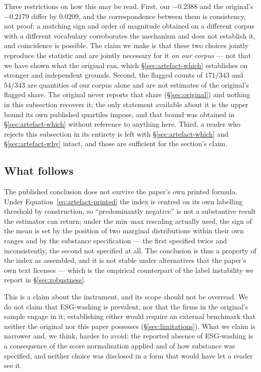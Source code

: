 Three restrictions on how this may be read. First, our $-0.2388$ and the
original's $-0.2179$ differ by $0.0209$, and the correspondence between them is
consistency, not proof: a matching sign and order of magnitude obtained on a
different corpus with a different vocabulary corroborates
the mechanism and does not establish it, and coincidence is possible. The claim
we make is that these two choices jointly reproduce the statistic and are
jointly necessary for it \emph{on our corpus} --- not that we have shown what
the original ran, which \S\ref{sec:artefact-which} establishes on stronger and
independent grounds. Second, the flagged counts of $171/343$ and $54/343$
are quantities of our corpus alone and are not estimates of the original's
flagged share. The original never reports that share (\S\ref{sec:original}) and
nothing in this subsection recovers it; the only statement available about it is
the upper bound its own published quartiles impose, and that bound was obtained
in \S\ref{sec:artefact-which} without reference to anything here. Third, a
reader who rejects this subsection in its entirety is left with
\S\ref{sec:artefact-which} and \S\ref{sec:artefact-why} intact, and those are
sufficient for the section's claim.

\subsection{What follows}
\label{sec:artefact-scope}

The published conclusion does not survive the paper's own printed formula.
Under Equation~\eqref{eq:artefact-printed} the index is centred on its own
labelling threshold by construction, so ``predominantly negative'' is not a
substantive result the estimator can return; under the min--max rescaling
actually used, the sign of the mean is set by the position of two marginal
distributions within their own ranges and by the substance specification --- the
first specified twice and inconsistently, the second not specified at all. The
conclusion is thus a property of the index as assembled, and it is not stable
under alternatives that the paper's own text licenses --- which is the empirical
counterpart of the label instability we report in \S\ref{sec:robustness}.

This is a claim about the instrument, and its scope should not be overread. We
do not claim that ESG-washing is prevalent, nor that the firms in the
original's sample engage in it; establishing either would require an external
benchmark that neither the original nor this paper possesses
(\S\ref{sec:limitations}). What we claim is narrower and, we think, harder to
avoid: the reported absence of ESG-washing is a consequence of the score
normalisation applied and of how substance was specified, and neither choice
was disclosed in a form that would have let a reader see it.
